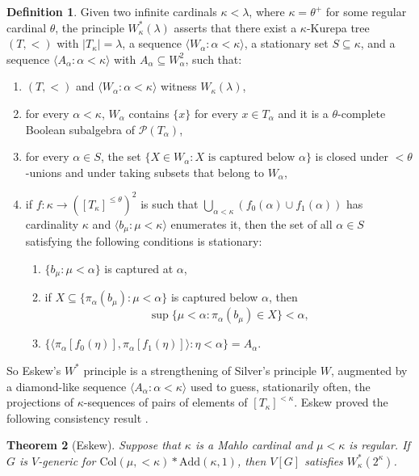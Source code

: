 \documentclass[]{amsart}
\newtheorem{theorem}{Theorem}
\theoremstyle{definition}
\newtheorem{definition}[theorem]{Definition}
\theoremstyle{remark}
\begin{document}
\begin{definition}
Given two infinite cardinals $\kappa< \lambda$, where $\kappa = \theta^+$ for some regular cardinal $\theta$, the principle $W^*_{\kappa}(\lambda)$ asserts that there exist a $\kappa$-Kurepa tree $(T, <)$ with $|T_{\kappa}| = \lambda$, a sequence $\langle W_\alpha : \alpha < \kappa\rangle$, a stationary set $S \subseteq \kappa$, and a sequence $\langle A_\alpha : \alpha < \kappa\rangle$ with $A_\alpha \subseteq W_\alpha^2$, such that:
\begin{enumerate}
\item $(T, <)$ and $\langle W_\alpha : \alpha < \kappa\rangle$ witness $W_{\kappa}(\lambda)$,
\item for every $\alpha < \kappa$, $W_\alpha$ contains $\{x\}$ for every $x \in T_\alpha$ and it is a $\theta$-complete Boolean subalgebra of $\mathcal{P}(T_\alpha)$,
\item for every $\alpha \in S$, the set $\{X \in W_\alpha : X \text{ is captured below } \alpha\}$ is closed under ${<}\theta$-unions and under taking subsets that belong to $W_\alpha$,
\item if $f:\kappa \rightarrow ([T_{\kappa}]^{\le \theta})^2$ is such that $\bigcup_{\alpha < \kappa} (f_0(\alpha) \cup f_1(\alpha))$ has cardinality $\kappa$ and $\langle b_\mu : \mu < \kappa\rangle$ enumerates it, then the set of all $\alpha \in S$ satisfying the following conditions is stationary:
\begin{enumerate}
\item $\{b_\mu : \mu < \alpha\}$ is captured at $\alpha$,
\item if $X \subseteq \{\pi_\alpha(b_\mu) : \mu < \alpha\}$ is captured below $\alpha$, then \[\sup \{\mu < \alpha: \pi_{\alpha}(b_\mu) \in X\} < \alpha,\]
\item $\{\langle \pi_\alpha[f_0(\eta)], \pi_\alpha[f_1(\eta)]\rangle : \eta < \alpha\} = A_\alpha$.
\end{enumerate} 
\end{enumerate}
\end{definition}

So Eskew's $W^*$ principle is a strengthening of Silver's principle $W$,  augmented by a diamond-like sequence $\langle A_\alpha : \alpha < \kappa\rangle$ used to guess, stationarily often, the projections of $\kappa$-sequences of pairs of elements of $[T_\kappa]^{< \kappa}$. Eskew proved the following consistency result \cite{MR3326048}.
\begin{theorem}[Eskew]
Suppose that $\kappa$ is a Mahlo cardinal and $\mu < \kappa$ is regular. If $G$ is $V$-generic for $\mathrm{Col}(\mu, {<}\kappa) * \mathrm{Add}(\kappa, 1)$, then $V[G]$ satisfies $W^*_\kappa(2^\kappa)$.
\end{theorem}
\end{document}
